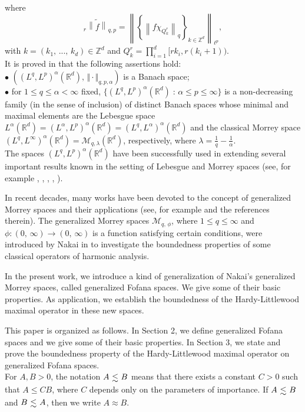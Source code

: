\documentclass[a4paper,12pt,intlimits,oneside]{amsart}
\numberwithin{equation}{section}
\numberwithin{equation}{section}
\def\lsim{\raisebox{-1ex}{$~\stackrel{\textstyle <}{\sim}~$}}
\theoremstyle{definition}
\begin{document}
where 
$$_{r}\widetilde{\left\|f\right\|}_{q,p}= \left\|\left\{  \left\|f\chi_{Q^{r}_{k}}\right\|_{q} \right\}_{k \in \mathbb{Z}^{d} }\right\|_{\ell^{p}},  $$
with $k=(k_{1},\, ...,\,k_{d})\in \mathbb{Z}^{d}$ and
 $ Q^{r}_{k} = \prod_{i=1}^{d}  [rk_{i}, r(k_{i}+1)) $.\\
 It is proved in \cite{IF1} that the following assertions hold:\\
 $ \bullet $ $\left(\left(L^{q},L^{p}\right)^{\alpha}(\mathbb{R}^d),\, \Vert \cdot \Vert_{q,p, \alpha }\right)$ is a Banach space; \\
 $ \bullet $ for $1 \leq q \leq \alpha < \infty $ fixed, $\{\left(L^{q},L^{p}\right)^{\alpha}(\mathbb{R}^d)\; :\, \alpha\leq p \leq \infty \}$ is a non-decreasing family (in the sense of inclusion) of distinct Banach spaces whose minimal and maximal elements are the Lebesgue space $L^{\alpha}(\mathbb{R}^d) = \left(L^{\alpha},L^{p}\right)^{\alpha}(\mathbb{R}^d)= \left(L^{q},L^{\alpha}\right)^{\alpha}(\mathbb{R}^d) $ and the classical Morrey space $ \left(L^{q},L^{\infty}\right)^{\alpha}(\mathbb{R}^d) = \mathcal{M}_{q, \lambda}(\mathbb{R}^{d})$, respectively, where $\lambda= \frac{1}{q} -\frac{1}{\alpha}$.\\
The spaces $ \left(L^{q},L^{p}\right)^{\alpha}(\mathbb{R}^d) $ have been successfully used in extending several important results known in the setting of Lebesgue and Morrey spaces (see, for example \cite{DFS}, \cite{JF2}, \cite{JF}, \cite{KFK}, \cite{MF}).


In recent decades, many works have been devoted to the concept of generalized Morrey spaces and their applications (see, for example \cite{Sa} and the references therein). The generalized Morrey spaces $\mathcal{M}_{q,\, \phi}$, where $1\leq q \leq \infty $ and $\phi : (0,\,\infty) \to (0, \,\infty)$ is a function satisfying certain conditions, were introduced by Nakai in \cite{EN} to investigate the boundedness properties of some classical operators of harmonic analysis.


In the present work, we introduce a kind of generalization of Nakai's generalized Morrey spaces, called generalized Fofana spaces. We give some of their basic properties. As application, we establish the boundedness of the Hardy-Littlewood maximal operator in these new spaces.

     
This paper is organized as follows. In Section 2, we define generalized Fofana spaces and we give some of their basic properties. In Section 3, we state and prove the boundedness property of the Hardy-Littlewood maximal operator on generalized Fofana spaces.\\
For $A,B>0$, the notation $A \lsim B$ means that there exists a constant $C>0$ such that $A \leq C B$, where $C$ depends only on the parameters of importance. If $ A \lsim B$ and $B \lsim A$, then we write $ A\approx  B$.
\end{document}
